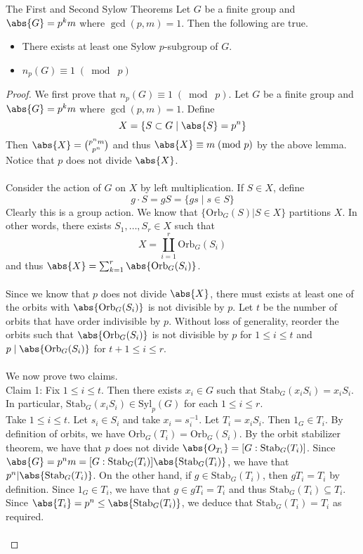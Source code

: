 \documentclass[a4paper]{article}
\begin{document}
\begin{thm}{The First and Second Sylow Theorems}{} Let $G$ be a finite group and $\abs{G}=p^km$ where $\gcd(p,m)=1$. Then the following are true. 
\begin{itemize}
\item There exists at least one Sylow $p$-subgroup of $G$. 
\item $n_p(G)\equiv1\;(\bmod\;p)$
\end{itemize} \tcbline
\begin{proof}
We first prove that $n_p(G)\equiv 1\;(\bmod\;p)$. Let $G$ be a finite group and $\abs{G}=p^km$ where $\gcd(p,m)=1$. Define $$X=\{S\subset G\;|\;\abs{S}=p^n\}$$ Then $\abs{X}=\binom{p^nm}{p^n}$ and thus $\abs{X}\equiv m\;(\bmod\;p)$ by the above lemma. Notice that $p$ does not divide $\abs{X}$. \\~\\

Consider the action of $G$ on $X$ by left multiplication. If $S\in X$, define $$g\cdot S=gS=\{gs\;|\;s\in S\}$$ Clearly this is a group action. We know that $\{\text{Orb}_G(S)|S\in X\}$ partitions $X$. In other words, there exists $S_1,\dots,S_r\in X$ such that $$X=\coprod_{i=1}^r\text{Orb}_G(S_i)$$ and thus $\abs{X}=\sum_{k=1}^r\abs{\text{Orb}_G(S_i)}$. \\~\\
Since we know that $p$ does not divide $\abs{X}$, there must exists at least one of the orbits with $\abs{\text{Orb}_G(S_i)}$ is not divisible by $p$. Let $t$ be the number of orbits that have order indivisible by $p$. Without loss of generality, reorder the orbits such that $\abs{\text{Orb}_G(S_i)}$ is not divisible by $p$ for $1\leq i\leq t$ and $p\;|\;\abs{\text{Orb}_G(S_i)}$ for $t+1\leq i\leq r$. \\~\\

We now prove two claims. \\
Claim 1: Fix $1\leq i\leq t$. Then there exists $x_i\in G$ such that $\text{Stab}_G(x_iS_i)=x_iS_i$. In particular, $\text{Stab}_G(x_iS_i)\in\text{Syl}_p(G)$ for each $1\leq i\leq r$. \\
Take $1\leq i\leq t$. Let $s_i\in S_i$ and take $x_i=s_i^{-1}$. Let $T_i=x_iS_i$. Then $1_G\in T_i$. By definition of orbits, we have $\text{Orb}_G(T_i)=\text{Orb}_G(S_i)$. By the orbit stabilizer theorem, we have that $p$ does not divide $\abs{O_{T_i}}=[G:\text{Stab}_G(T_i)]$. Since $\abs{G}=p^nm=[G:\text{Stab}_G(T_i)]\abs{\text{Stab}_G(T_i)}$, we have that $p^n|\abs{\text{Stab}_G(T_i)}$. On the other hand, if $g\in\text{Stab}_G(T_i)$, then $gT_i=T_i$ by definition. Since $1_G\in T_i$, we have that $g\in gT_i=T_i$ and thus $\text{Stab}_G(T_i)\subseteq T_i$. Since $\abs{T_i}=p^n\leq\abs{\text{Stab}_G(T_i)}$, we deduce that $\text{Stab}_G(T_i)=T_i$ as required. \\~\\


\end{proof}
\end{thm}
\end{document}
